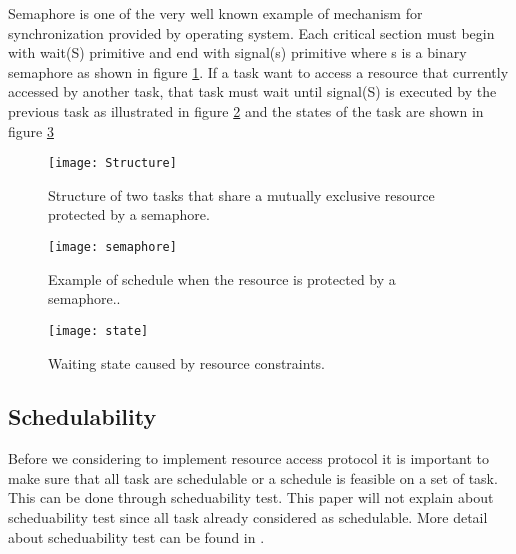 Semaphore is one of the very well known example of mechanism for synchronization provided by operating system. Each critical section must begin with wait(S) primitive and end with signal(s) primitive where s is a binary semaphore as shown in figure \ref{fig:Structure}. If a task want to access a resource that currently accessed by another task, that task must wait until signal(S) is executed by the previous task as illustrated in figure \ref{fig:semaphore} and the states of the task are shown in figure \ref{fig:state}

\begin{figure}[h]
    \centering
    \texttt{[image: Structure]}
    \caption{Structure of two tasks that share a mutually exclusive resource protected by
a semaphore. \cite{b5}}
    \label{fig:Structure}
\end{figure}

\begin{figure}[h]
    \centering
    \texttt{[image: semaphore]}
    \caption{Example of schedule when the resource is protected by a semaphore.. \cite{b5}}
    \label{fig:semaphore}
\end{figure}

\begin{figure}[h]
    \centering
    \texttt{[image: state]}
    \caption{Waiting state caused by resource constraints. \cite{b5}}
    \label{fig:state}
\end{figure}



\subsection{Schedulability}

Before we considering to implement resource access protocol it is important to make sure that all task are schedulable or a schedule is feasible on a set of task. This can be done through scheduability test. This paper will not explain about scheduability test since all task already considered as schedulable. More detail about scheduability test can be found in \cite{b5}.





